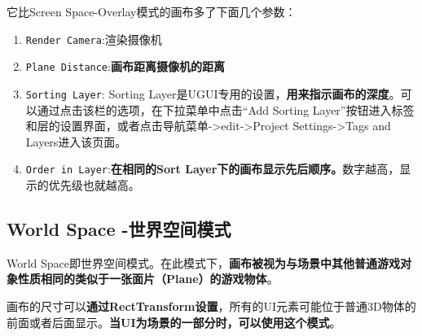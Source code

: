 \documentclass[UTF8,a4paper,12pt]{ctexbook}
\begin{document}
			它比Screen Space-Overlay模式的画布多了下面几个参数：
				\begin{enumerate}[itemindent = 1em]
					\item \verb|Render Camera|:渲染摄像机
					\item \verb|Plane Distance|:\textbf{画布距离摄像机的距离}
					\item \verb|Sorting Layer|: Sorting Layer是UGUI专用的设置，\textbf{用来指示画布的深度}。可以通过点击该栏的选项，在下拉菜单中点击“Add Sorting Layer”按钮进入标签和层的设置界面，或者点击导航菜单->edit->Project Settings->Tags and Layers进入该页面。
					\item \verb|Order in Layer|:\textbf{在相同的Sort Layer下的画布显示先后顺序。}数字越高，显示的优先级也就越高。
				\end{enumerate}
			
		\subsection{World Space -世界空间模式}
			World Space即世界空间模式。在此模式下，\textbf{画布被视为与场景中其他普通游戏对象性质相同的类似于一张面片（Plane）的游戏物体}。
			
			画布的尺寸可以\textbf{通过RectTransform设置}，所有的UI元素可能位于普通3D物体的前面或者后面显示。\textbf{当UI为场景的一部分时，可以使用这个模式}。
			
\end{document}
